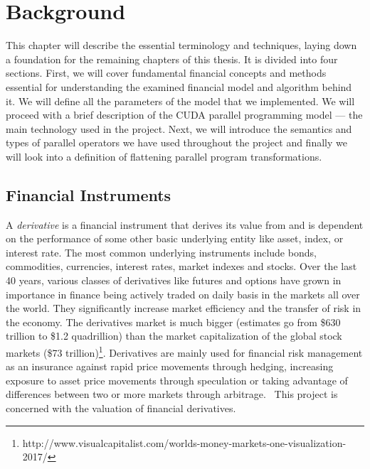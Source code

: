 \chapter{Background}
\label{chapter:background}
This chapter will describe the essential terminology and techniques, laying down a foundation for the remaining chapters of this thesis. It is divided into four sections. First, we will cover fundamental financial concepts and methods essential for understanding the examined financial model and algorithm behind it. We will define all the parameters of the model that we implemented. We will proceed with a brief description of the CUDA parallel programming model --- the main technology used in the project. Next, we will introduce the semantics and types of parallel operators we have used throughout the project and finally we will look into a definition of flattening parallel program transformations.

\section{Financial Instruments}
A \textit{derivative} is a financial instrument that derives its value from and is dependent on the performance of some other basic underlying entity like asset, index, or interest rate. The most common underlying instruments include bonds, commodities, currencies, interest rates, market indexes and stocks. Over the last 40 years, various classes of derivatives like futures and options have grown in importance in finance being actively traded on daily basis in the markets all over the world. They significantly increase market efficiency and the transfer of risk in the economy. The derivatives market is much bigger (estimates go from \$630 trillion to \$1.2 quadrillion) than the market capitalization of the global stock markets (\$73 trillion)\footnote{http://www.visualcapitalist.com/worlds-money-markets-one-visualization-2017/}. Derivatives are mainly used for financial risk management as an insurance against rapid price movements through hedging, increasing exposure to asset price movements through speculation or taking advantage of differences between two or more markets through arbitrage.~\cite[pg.1-18]{ofod} This project is concerned with the valuation of financial derivatives.

